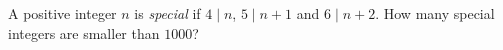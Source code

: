 A positive integer $n$ is \emph{special} if $4\mid n$, $5\mid n+1$ and $6\mid n+2$. How many special integers are smaller than $1000$?
